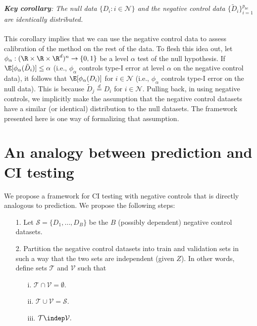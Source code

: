 \documentclass[12pt]{article}
\begin{document}
\\ \\
\textit{\textbf{Key corollary}: The null data $\{ D_i : i \in \mathcal{N} \}$ and the negative control data $\{ \tilde{D}_i \}_{i=1}^{p_\textrm{nc}}$ are identically distributed.}
\\ \\
This corollary implies that we can use the negative control data to assess calibration of the method on the rest of the data. To flesh this idea out, let $\phi_\alpha: ( \R \times \R \times \R^d )^n \to \{0,1\}$ be a level $\alpha$ test of the null hypothesis. If
$\E [ \phi_\alpha( \tilde{D}_i ) ] \leq \alpha$ (i.e., $\phi_\alpha$ controls type-I error at level $\alpha$ on the negative control data), it follows that $\E[ \phi_\alpha(D_i)]$ for $i \in \mathcal{N}$ (i.e., $\phi_\alpha$ controls type-I error on the null data). This is because $\tilde{D}_j \stackrel{d}{=} D_i$ for $i \in \mathcal{N}.$ Pulling back, in using negative controls, we implicitly make the assumption that the negative control datasets have a similar (or identical) distribution to the null datasets. The framework presented here is one way of formalizing that assumption.




\section{An analogy between prediction and CI testing}

We propose a framework for CI testing with negative controls that is directly analogous to prediction. We propose the following steps:
\begin{itemize}
\item[1.] Let $\mathcal{S} = \{ D_1, \dots, D_B \}$ be the $B$ (possibly dependent) negative control datasets.
\item[2.] Partition the negative control datasets into train and validation sets in such a way that the two sets are independent (given $Z$). In other words, define sets $\mathcal{T}$ and $\mathcal{V}$ such that 
\begin{itemize}
\item[i.] $\mathcal{T} \cap \mathcal{V} = \emptyset.$
\item[ii.] $ \mathcal{T} \cup \mathcal{V} = \mathcal{S}.$ 
\item[iii.] $\mathcal{T} \indep \mathcal{V}.$
\end{itemize}
\end{itemize}
\end{document}

